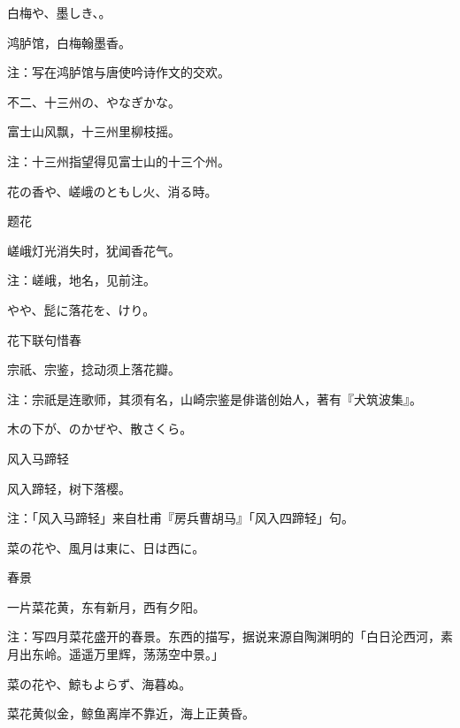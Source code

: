 \begin{haiku}
    {\FH 白梅や、墨しき、。}

    {\FK 鸿胪馆，白梅翰墨香。}

    {\FT 注：写在鸿胪馆与唐使吟诗作文的交欢。}
\end{haiku}

\begin{haiku}
    {\FH 不二、十三州の、やなぎかな。}

    {\FK 富士山风飘，十三州里柳枝摇。}

    {\FT 注：十三州指望得见富士山的十三个州。}
\end{haiku}

\begin{haiku}
    {\FH 花の香や、嵯峨のともし火、消る時。}

    {\FK 题花}

    {\FK 嵯峨灯光消失时，犹闻香花气。}

    {\FT 注：嵯峨，地名，见前注。}
\end{haiku}

\begin{haiku}
    {\FH {}やや、髭に落花を、けり。}

    {\FK 花下联句惜春}

    {\FK 宗祇、宗鉴，捻动须上落花瓣。}

    {\FT 注：宗祇是连歌师，其须有名，山崎宗鉴是俳谐创始人，著有『犬筑波集』。}
\end{haiku}

\begin{haiku}
    {\FH 木の下が、のかぜや、散さくら。}

    {\FK 风入马蹄轻}

    {\FK 风入蹄轻，树下落樱。}

    {\FT 注：「风入马蹄轻」来自杜甫『房兵曹胡马』「风入四蹄轻」句。}
\end{haiku}

\begin{haiku}
    {\FH 菜の花や、風月は東に、日は西に。}

    {\FK 春景}

    {\FK 一片菜花黄，东有新月，西有夕阳。}

    {\FT 注：写四月菜花盛开的春景。东西的描写，据说来源自陶渊明的「白日沦西河，素月出东岭。遥遥万里辉，荡荡空中景。」}
\end{haiku}

\begin{haiku}
    {\FH 菜の花や、鯨もよらず、海暮ぬ。}

    {\FK 菜花黄似金，鲸鱼离岸不靠近，海上正黄昏。}
\end{haiku}

